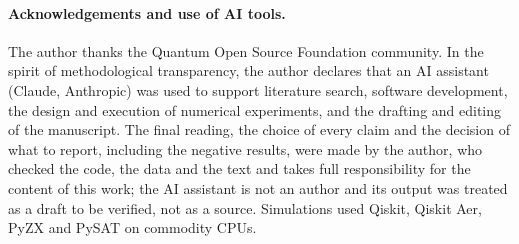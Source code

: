 \documentclass[10pt,twocolumn]{article}
\begin{document}
\paragraph{Acknowledgements and use of AI tools.} The author thanks the Quantum Open Source Foundation community. In the spirit of methodological transparency, the author declares that an AI assistant (Claude, Anthropic) was used to support literature search, software development, the design and execution of numerical experiments, and the drafting and editing of the manuscript. The final reading, the choice of every claim and the decision of what to report, including the negative results, were made by the author, who checked the code, the data and the text and takes full responsibility for the content of this work; the AI assistant is not an author and its output was treated as a draft to be verified, not as a source. Simulations used Qiskit, Qiskit Aer, PyZX and PySAT on commodity CPUs.


\appendix










\end{document}
